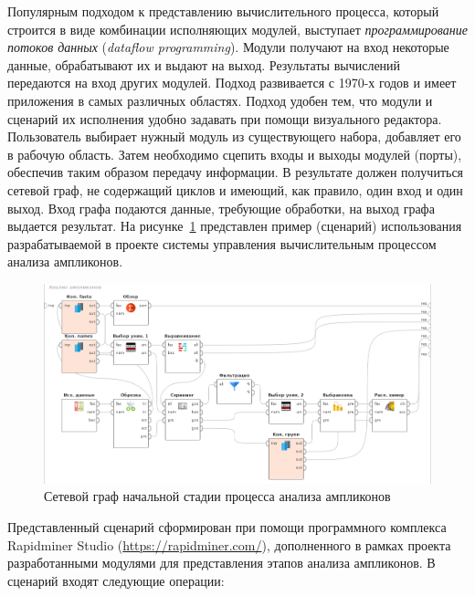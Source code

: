 \documentclass[a4paper,12pt,openany,final]{extreport}
\def\oldcaption{} \let\oldcaption=\caption
\def\caption{\stepcounter{captionsnum}\oldcaption}
\begin{document}
Популярным подходом к представлению вычислительного процесса, который строится в виде комбинации исполняющих модулей, выступает \emph{программирование потоков данных} (\emph{dataflow programming}).  Модули получают на вход некоторые данные, обрабатывают их и выдают на выход. Результаты вычислений передаются на вход других модулей. Подход развивается с 1970-х годов и имеет приложения в самых различных областях. Подход удобен тем, что модули и сценарий их исполнения удобно задавать при помощи визуального редактора. Пользователь выбирает нужный модуль из существующего набора, добавляет его в рабочую область. Затем необходимо сцепить входы и выходы модулей (порты), обеспечив таким образом передачу информации. В результате должен получиться сетевой граф, не содержащий циклов и имеющий, как правило, один вход и один выход. Вход графа подаются данные, требующие обработки, на выход графа выдается результат. На рисунке~\ref{fig:ampl-an} представлен пример (сценарий) использования разрабатываемой в проекте системы управления вычислительным процессом анализа ампликонов.

\begin{figure}[htbp]\centering
\includegraphics[width=0.9\linewidth]{media/image14.png}
\caption{Сетевой граф начальной стадии процесса анализа ампликонов}
\label{fig:ampl-an}
\end{figure}

Представленный сценарий сформирован при помощи программного комплекса Rapidminer Studio (\url{https://rapidminer.com/}), дополненного в рамках проекта разработанными модулями для представления этапов анализа ампликонов. В сценарий входят следующие операции:
\end{document}
